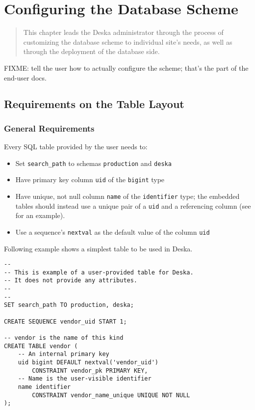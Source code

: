 \documentclass[deska]{subfiles}
\begin{document}
\chapter{Configuring the Database Scheme}
\label{sec:admin-dbscheme}

\begin{abstract}
This chapter leads the Deska administrator through the process of customizing the database scheme to individual site's
needs, as well as through the deployment of the database side.
\end{abstract}

FIXME: tell the user how to actually configure the scheme; that's the part of the end-user docs.

\section{Requirements on the Table Layout}
\label{sec:db-scheme-req}

\subsection{General Requirements}
Every SQL table provided by the user needs to:

\begin{itemize}
    \item Set {\tt search\_path} to schemas {\tt production} and {\tt deska}
    \item Have primary key column {\tt uid} of the {\tt bigint} type
    \item Have unique, not null column {\tt name} of the {\tt identifier} type; the embedded tables should instead use a
        unique pair of a {\tt uid} and a referencing column (see  for an example).
    \item Use a sequence's {\tt nextval} as the default value of the column {\tt uid}
\end{itemize}

Following example shows a simplest table to be used in Deska.

\begin{verbatim}
--
-- This is example of a user-provided table for Deska.
-- It does not provide any attributes.
--
--
SET search_path TO production, deska;

CREATE SEQUENCE vendor_uid START 1;

-- vendor is the name of this kind
CREATE TABLE vendor (
    -- An internal primary key
    uid bigint DEFAULT nextval('vendor_uid')
        CONSTRAINT vendor_pk PRIMARY KEY,
    -- Name is the user-visible identifier
    name identifier
        CONSTRAINT vendor_name_unique UNIQUE NOT NULL
);
\end{verbatim}
\end{document}
